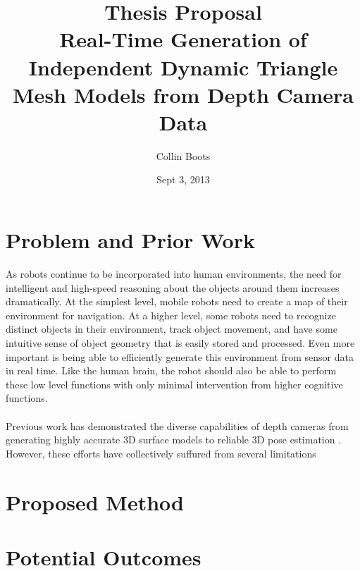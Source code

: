 \documentclass[english]{article}
\title{Thesis Proposal \\ Real-Time Generation of Independent Dynamic Triangle Mesh Models from Depth Camera Data}
\author{Collin Boots}
\date{Sept 3, 2013}
\begin{document}
\maketitle
\section*{Problem and Prior Work}
As robots continue to be incorporated into human environments, the need for intelligent and high-speed reasoning about the objects around them increases dramatically. At the simplest level, mobile robots need to create a map of their environment for navigation. At a higher level, some robots need to recognize distinct objects in their environment, track object movement, and have some intuitive sense of object geometry that is easily stored and processed. Even more important is being able to efficiently generate this environment from sensor data in real time. Like the human brain, the robot should also be able to perform these low level functions with only minimal intervention from higher cognitive functions.\\
\\
Previous work has demonstrated the diverse capabilities of depth cameras from generating highly accurate 3D surface models \cite{KinectFusion} to reliable 3D pose estimation \cite{Endres,Taguchi}. However, these efforts have collectively suffured from several limitations
\section*{Proposed Method}
\section*{Potential Outcomes}



\end{document}
